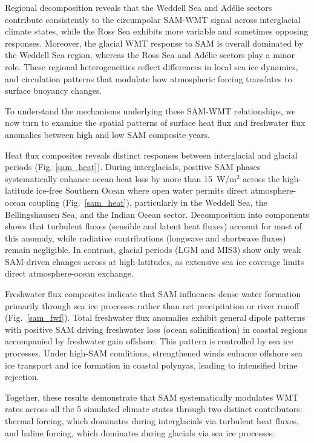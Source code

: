 \documentclass[pdflatex,sn-nature]{sn-jnl}
\begin{document}
Regional decomposition reveals that the Weddell Sea and Ad\'elie sectors contribute consistently to the circumpolar SAM-WMT signal across interglacial climate states, while the Ross Sea exhibits more variable and sometimes opposing responses. Moreover, the glacial WMT response to SAM is overall dominated by the Weddell Sea region, whereas the Ross Sea and Ad\'elie sectors play a minor role. These regional  heterogeneities reflect differences in local sea ice dynamics, and circulation patterns that modulate how atmospheric forcing translates to surface
  buoyancy changes.


To understand the mechanisms underlying these SAM-WMT relationships, we now turn to examine the spatial patterns of surface heat flux and freshwater flux anomalies between high and low SAM composite years.

Heat flux composites reveals  distinct responses between interglacial and glacial periods (Fig. \ref{sam_heat}). During interglacials, positive SAM phases systematically enhance ocean heat loss by more than 15~W/m$^2$ across the high-latitude ice-free  Southern Ocean where open water permits direct atmosphere-ocean coupling  (Fig.~\ref{sam_heat}), particularly in the Weddell Sea, the Bellingshausen Sea, and the Indian Ocean sector. Decomposition into components shows that turbulent fluxes (sensible and latent heat fluxes) account for most of this anomaly, while radiative contributions (longwave and shortwave fluxes) remain negligible.  In contrast, glacial periods (LGM and MIS3) show only weak SAM-driven changes across at high-latitudes, as extensive sea ice coverage limits direct atmosphere-ocean exchange.


Freshwater flux composites indicate that SAM influences dense water formation primarily through sea ice processes rather than net precipitation or river runoff (Fig.~\ref{sam_fwf}). Total freshwater flux anomalies exhibit general dipole patterns with positive SAM driving freshwater loss (ocean salinification) in coastal regions accompanied by freshwater gain offshore. This pattern is controlled by sea ice processes. Under high-SAM conditions, strengthened winds enhance offshore sea ice transport and ice formation in coastal polynyas, leading to intensified brine rejection.

Together, these results demonstrate that SAM systematically modulates WMT rates across all the 5 simulated climate states through two distinct contributors: thermal forcing, which dominates during interglacials via turbulent heat fluxes, and haline forcing, which dominates during glacials via sea ice processes.
\end{document}

